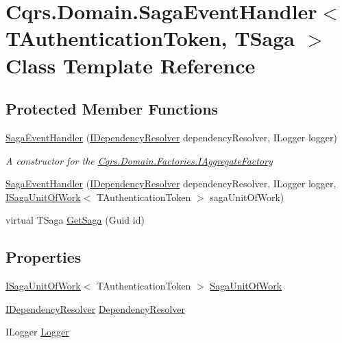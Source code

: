 \hypertarget{classCqrs_1_1Domain_1_1SagaEventHandler}{}\section{Cqrs.\+Domain.\+Saga\+Event\+Handler$<$ T\+Authentication\+Token, T\+Saga $>$ Class Template Reference}
\label{classCqrs_1_1Domain_1_1SagaEventHandler}
\subsection*{Protected Member Functions}
\begin{DoxyCompactItemize}
\item 
\hyperlink{classCqrs_1_1Domain_1_1SagaEventHandler_a4ad68643dd845330a96c71039cf0897f}{Saga\+Event\+Handler} (\hyperlink{interfaceCqrs_1_1Configuration_1_1IDependencyResolver}{I\+Dependency\+Resolver} dependency\+Resolver, I\+Logger logger)
\begin{DoxyCompactList}\small\item\em A constructor for the \hyperlink{interfaceCqrs_1_1Domain_1_1Factories_1_1IAggregateFactory}{Cqrs.\+Domain.\+Factories.\+I\+Aggregate\+Factory} \end{DoxyCompactList}\item 
\hyperlink{classCqrs_1_1Domain_1_1SagaEventHandler_a061ebe3676b158d952b26629195df627}{Saga\+Event\+Handler} (\hyperlink{interfaceCqrs_1_1Configuration_1_1IDependencyResolver}{I\+Dependency\+Resolver} dependency\+Resolver, I\+Logger logger, \hyperlink{interfaceCqrs_1_1Domain_1_1ISagaUnitOfWork}{I\+Saga\+Unit\+Of\+Work}$<$ T\+Authentication\+Token $>$ saga\+Unit\+Of\+Work)
\item 
virtual T\+Saga \hyperlink{classCqrs_1_1Domain_1_1SagaEventHandler_ad3ef0b5067004d4930c45a6585f54764}{Get\+Saga} (Guid id)
\end{DoxyCompactItemize}
\subsection*{Properties}
\begin{DoxyCompactItemize}
\item 
\hyperlink{interfaceCqrs_1_1Domain_1_1ISagaUnitOfWork}{I\+Saga\+Unit\+Of\+Work}$<$ T\+Authentication\+Token $>$ \hyperlink{classCqrs_1_1Domain_1_1SagaEventHandler_a4cab45aafb7b71534aae7cbe077d1129}{Saga\+Unit\+Of\+Work}
\item 
\hyperlink{interfaceCqrs_1_1Configuration_1_1IDependencyResolver}{I\+Dependency\+Resolver} \hyperlink{classCqrs_1_1Domain_1_1SagaEventHandler_ad7497b0e19703aa351e571427a072d0d}{Dependency\+Resolver}
\item 
I\+Logger \hyperlink{classCqrs_1_1Domain_1_1SagaEventHandler_a06c2d4b3720bec78e9cea40cb0ed2ff3}{Logger}
\end{DoxyCompactItemize}


